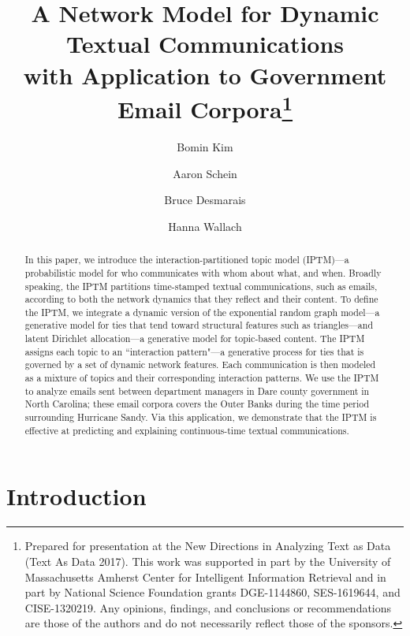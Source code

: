 \documentclass[a4paper]{article}
\title{A Network Model for Dynamic Textual Communications \\with Application to
	Government Email Corpora\footnote{\noindent Prepared for presentation at the New Directions in Analyzing Text as Data (Text As Data 2017). This work was supported in part by the University of Massachusetts Amherst Center for Intelligent Information Retrieval and in part by National Science Foundation grants DGE-1144860, SES-1619644, and CISE-1320219. Any opinions, findings, and conclusions or recommendations are those of the authors and do not necessarily reflect those of the sponsors. }}
\author[1]{Bomin Kim}
\author[3]{Aaron Schein}
\author[1]{Bruce Desmarais}
\author[2,3]{Hanna Wallach}
\affil[1]{Pennsylvania State University}
\affil[2]{Microsoft Research NYC}
\affil[3]{University of Massachusetts Amherst}
\begin{document}
\setlength{\parindent}{0pt}
\maketitle
\begin{abstract}
	
	\noindent In this paper, we introduce the interaction-partitioned topic model
	(IPTM)---a probabilistic model for who communicates with whom about
	what, and when. Broadly speaking, the IPTM partitions time-stamped
	textual communications, such as emails, according to both the network
	dynamics that they reflect and their content. To define the IPTM, we
	integrate a dynamic version of the exponential random graph model---a
	generative model for ties that tend toward structural features such as
	triangles---and latent Dirichlet allocation---a generative model for
	topic-based content. The IPTM assigns each topic to an ``interaction
	pattern"---a generative process for ties that is governed by a set of
	dynamic network features. Each communication is then modeled as a
	mixture of topics and their corresponding interaction patterns. We use
	the IPTM to analyze emails sent between department managers in Dare
	county government in North Carolina; these email corpora
	covers the Outer Banks during the time period surrounding Hurricane
	Sandy. Via this application, we demonstrate that the IPTM is effective
	at predicting and explaining continuous-time textual communications.
\end{abstract}
\section{Introduction} \label{sec: Introduction}
\end{document}
